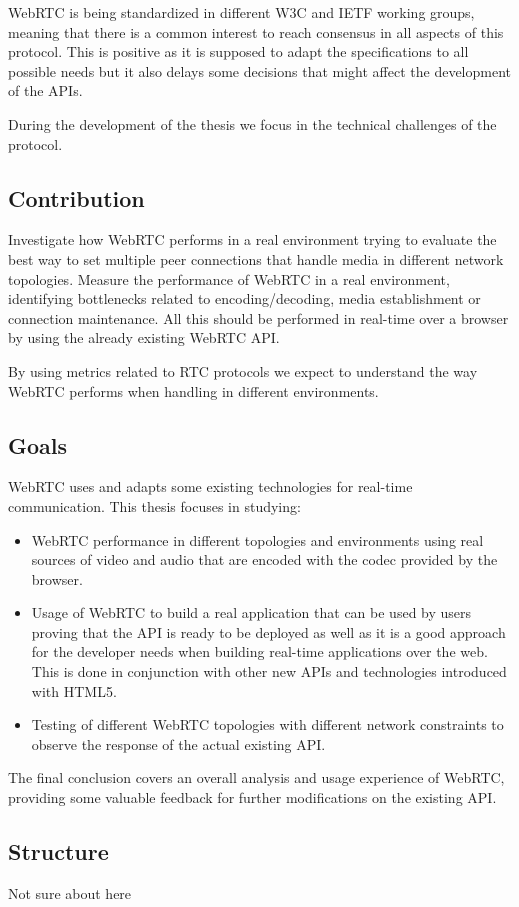 WebRTC is being standardized in different W3C and IETF working groups, meaning that there is a common interest to reach consensus in all aspects of this protocol. This is positive as it is supposed to adapt the specifications to all possible needs but it also delays some decisions that might affect the development of the APIs.

During the development of the thesis we focus in the technical challenges of the protocol.

\subsection{Contribution}

Investigate how WebRTC performs in a real environment trying to evaluate the best way to set multiple peer connections that handle media in different network topologies. Measure the performance of WebRTC in a real environment, identifying bottlenecks related to encoding/decoding, media establishment or connection maintenance. All this should be performed in real-time over a browser by using the already existing WebRTC API.

By using metrics related to RTC protocols we expect to understand the way WebRTC performs when handling in different environments.

\subsection{Goals}

WebRTC uses and adapts some existing technologies for real-time communication. This thesis focuses in studying:

\begin{itemize}
	\item WebRTC performance in different topologies and environments using real sources of video and audio that are encoded with the codec provided by the browser.
	
	\item Usage of WebRTC to build a real application that can be used by users proving that the API is ready to be deployed as well as it is a good approach for the developer needs when building real-time applications over the web. This is done in conjunction with other new APIs and technologies introduced with HTML5.
	
	\item Testing of different WebRTC topologies with different network constraints to observe the response of the actual existing API.
\end{itemize}

The final conclusion covers an overall analysis and usage experience of WebRTC, providing some valuable feedback for further modifications on the existing API.

\subsection{Structure}

Not sure about here